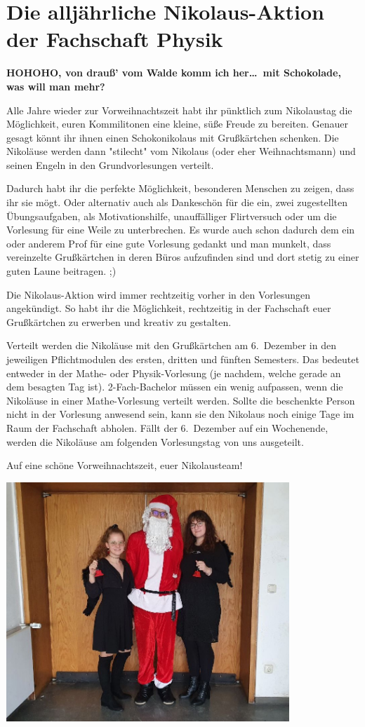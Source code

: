 \section{Die alljährliche Nikolaus-Aktion der Fachschaft Physik}
\begin{multicols}{2}
\textbf{HOHOHO, von drauß' vom Walde komm ich her\dots\
	mit Schokolade, was will man mehr?}

Alle Jahre wieder zur Vorweihnachtszeit habt ihr pünktlich zum Nikolaustag die Möglichkeit, euren Kommilitonen eine kleine, süße Freude zu bereiten. Genauer gesagt könnt ihr ihnen einen Schokonikolaus mit Grußkärtchen schenken. 
Die Nikoläuse werden dann "stilecht" vom Nikolaus (oder eher Weihnachtsmann) und seinen Engeln in den Grundvorlesungen verteilt.

Dadurch habt ihr die perfekte Möglichkeit, besonderen Menschen zu zeigen, dass ihr sie mögt. Oder alternativ auch als Dankeschön für die ein, zwei zugestellten Übungsaufgaben, als Motivationshilfe, unauffälliger Flirtversuch oder um die Vorlesung für eine Weile zu unterbrechen. Es wurde auch schon dadurch dem ein oder anderem Prof für eine gute Vorlesung gedankt und man munkelt, dass vereinzelte Grußkärtchen in deren Büros aufzufinden sind und dort stetig zu einer guten Laune beitragen. ;)

Die Nikolaus-Aktion wird immer rechtzeitig vorher in den Vorlesungen angekündigt. So habt ihr die Möglichkeit, rechtzeitig in der Fachschaft euer Grußkärtchen zu erwerben und kreativ zu gestalten. 

Verteilt werden die Nikoläuse mit den Grußkärtchen am 6.~Dezember in den jeweiligen Pflichtmodulen des ersten, dritten und fünften Semesters. Das bedeutet entweder in der Mathe- oder Physik-Vorlesung (je nachdem, welche gerade an dem besagten Tag ist).
2-Fach-Bachelor müssen ein wenig aufpassen, wenn die Nikoläuse in einer Mathe-Vorlesung verteilt werden.
Sollte die beschenkte Person nicht in der Vorlesung anwesend sein, kann sie den Nikolaus noch einige Tage im Raum der Fachschaft abholen.
Fällt der 6.~Dezember auf ein Wochenende, werden die Nikoläuse am folgenden Vorlesungstag von uns ausgeteilt.

Auf eine schöne Vorweihnachtszeit, euer Nikolausteam!

\end{multicols}

\vspace{\fill}
\begin{center}
	\includegraphics[width=0.8\textwidth]{res/Nikoklaus_cut.jpg}
\end{center}
